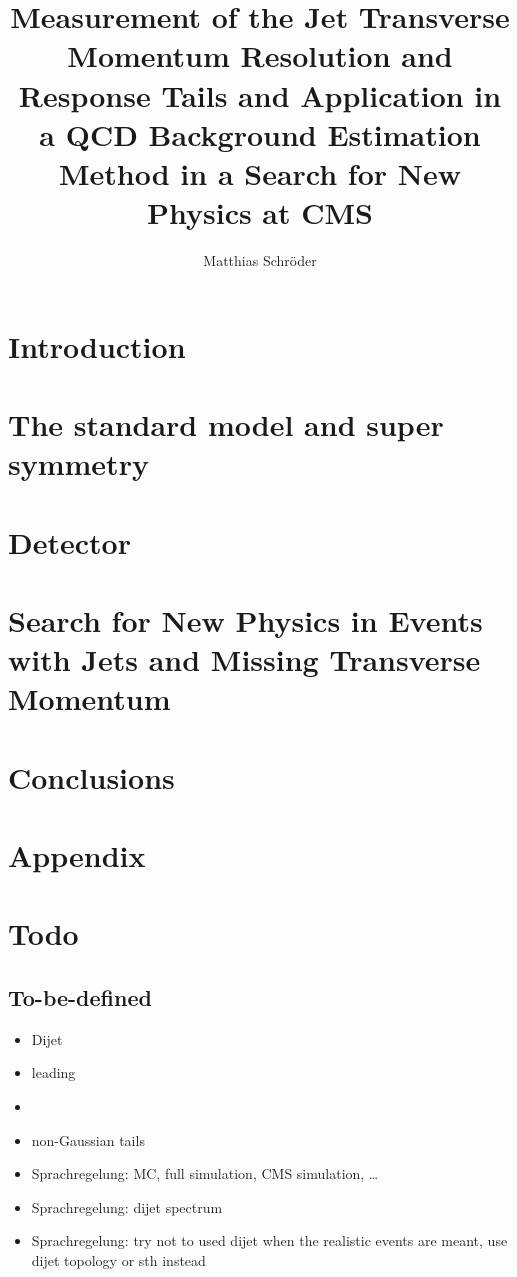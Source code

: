 \documentclass[
a4,
oneside,
headsepline,     %
normalheadings,
openany,
numbers=noenddot %
]{scrreprt} %
\title{Measurement of the Jet Transverse Momentum Resolution and Response Tails and Application in a QCD Background Estimation Method in a Search for New Physics at CMS}
\author{Matthias Schr\"oder}
\begin{document}
\maketitle
\tableofcontents

\chapter{Introduction}


\chapter{The standard model and super symmetry}
%


\chapter{Detector}
%


\chapter{Search for New Physics in Events with Jets and Missing Transverse Momentum}



\chapter{Conclusions}


\appendix
\chapter{Appendix}
%

\chapter{Todo}
\section{To-be-defined}
\begin{itemize}
\item Dijet
\item leading
\item \ptgen
\item non-Gaussian tails
\item Sprachregelung: MC, full simulation, CMS simulation, \dots
\item Sprachregelung: dijet \pt spectrum
\item Sprachregelung: try not to used dijet when the realistic events are meant, use dijet topology or sth instead
\end{itemize}
\end{document}
